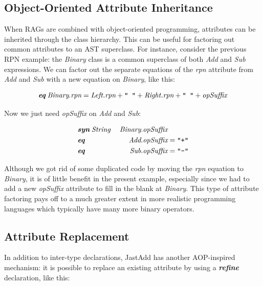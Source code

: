 \documentclass[10pt, twoside, openright]{book}
\begin{document}
\subsection{Object-Oriented Attribute Inheritance}
\label{sec:oo-attr}

When RAGs are combined with object-oriented programming, attributes can be inherited through
the class hierarchy. This can be useful for factoring out common attributes to an
AST superclass.
For instance, consider the previous RPN example: the \emph{Binary} class
is a common superclass of both \emph{Add} and \emph{Sub} expressions.
We can factor out the separate equations of the \emph{rpn} attribute from \emph{Add} and \emph{Sub}
with a new equation on \emph{Binary}, like this:

\begin{equation*}
\textit{\textbf{eq}} \; \textit{Binary}.\textit{rpn} = \textit{Left.rpn} + \texttt{" "} + \textit{Right.rpn} + \texttt{" "} + \textit{opSuffix}
\end{equation*}

\noindent
Now we just need \emph{opSuffix} on \emph{Add} and \emph{Sub}:

\begin{alignat*}{2}
& \textit{\textbf{syn}} \; \textit{String} \; &\textit{Binary}&.\textit{opSuffix} \\
& \textit{\textbf{eq}} \; &\textit{Add}&.\textit{opSuffix} = \texttt{"+"} \\
& \textit{\textbf{eq}} \; &\textit{Sub}&.\textit{opSuffix} = \texttt{"-"}
\end{alignat*}

\noindent
Although we got rid of some duplicated code by moving the \emph{rpn} equation to
\emph{Binary}, it is of little benefit in the present example, especially since we had
to add a new \emph{opSuffix} attribute to fill in the blank at \emph{Binary}.
This type of attribute factoring pays off to a much greater extent in more realistic programming
languages which typically have many more binary operators.


\subsection{Attribute Replacement}
\label{sec:refine}

In addition to inter-type declarations, JastAdd has another AOP-inspired mechanism:
it is possible to replace an existing attribute
by using a \textbf{\emph{refine}} declaration, like this:
\end{document}
